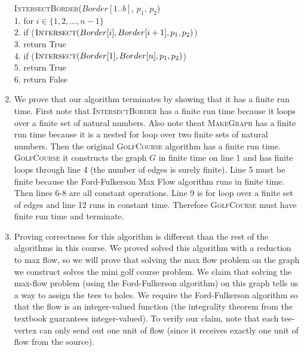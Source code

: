 \documentclass{article}
\begin{document}
\begin{enumerate}
\begin{algorithm}
        \textsc{IntersectBorder}($Border[1..b]$, $p_1$, $p_2$) \\
        1. \hspace{1em} for $i \in \{ 1, 2, ..., n-1 \}$ \\
        2. \hspace{2em}     if ($\textsc{Intersect}(Border[i], Border[i+1], p_1, p_2)$) \\
        3. \hspace{3em}         return True \\
        4. \hspace{1em} if ($\textsc{Intersect}(Border[1], Border[n], p_1, p_2)$) \\
        5. \hspace{2em}     return True \\
        6. \hspace{1em} return False
    \end{algorithm}
    \item We prove that our algorithm terminates by showing that it has a finite run time.
    First note that \textsc{IntersectBorder} has a finite run time because it loops over a finite set of natural numbers.
    Also note theat \textsc{MakeGraph} has a finite run time because it is a nested for loop over two finite sets of natural numbers.
    Then the original \textsc{GolfCourse} algorithm has a finite run time.
    \textsc{GolfCourse} it constructs the graph $G$ in finite time on line 1 and has finite loops through line 4 (the number of edges is surely finite).
    Line 5 must be finite because the Ford-Fulkerson Max Flow algorithm runs in finite time.
    Then lines 6-8 are all constant operations.
    Line 9 is for loop over a finite set of edges and line 12 runs in constant time.
    Therefore \textsc{GolfCourse} must have finite run time and terminate.
    \item Proving correctness for this algorithm is different than the rest of the algorithms in this course.
    We proved solved this algorithm with a reduction to max flow, so we will prove that solving the max flow problem on the graph we construct solves the mini golf course problem. \parspace
    We claim that solving the max-flow problem (using the Ford-Fulkerson algorithm) on this graph tells us a way to assign the tees to holes.
    We require the Ford-Fulkerson algorithm so that the flow is an integer-valued function (the integrality theorem from the textbook guarantees integer-valued).
    To verify our claim, note that each tee-vertex can only send out one unit of flow (since it receives exactly one unit of flow from the source).

\end{enumerate}
\end{document}
